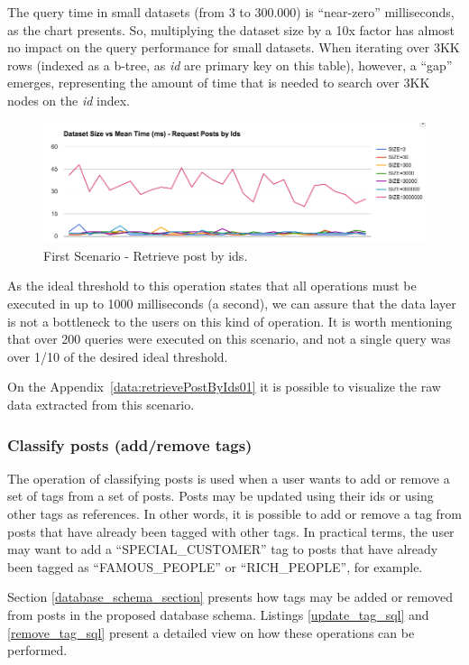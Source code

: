 The query time in small datasets (from 3 to 300.000) is ``near-zero'' milliseconds, as the chart presents. So, multiplying the dataset size by a 10x factor has almost no impact on the query performance for small datasets. When iterating over 3KK rows (indexed as a b-tree, as \textit{id} are primary key on this table), however, a ``gap'' emerges, representing the amount of time that is needed to search over 3KK nodes on the \textit{id} index. 

\begin{figure}
\centering
\includegraphics[width=150mm]{Imagens/execution-01.png}
\caption{First Scenario - Retrieve post by ids.\label{fig:first_scenario}}
\end{figure}

As the ideal threshold to this operation states that all operations must be executed in up to 1000 milliseconds (a second), we can assure that the data layer is not a bottleneck to the users on this kind of operation. It is worth mentioning that over 200 queries were executed on this scenario, and not a single query was over 1/10 of the desired ideal threshold. 



On the Appendix~\ref{data:retrievePostByIds01} it is possible to visualize the raw data extracted from this scenario. 

\clearpage
\subsubsection{Classify posts (add/remove tags)}

The operation of classifying posts is used when a user wants to add or remove a set of tags from a set of posts. Posts may be updated using their ids or using other tags as references. In other words, it is possible to add or remove a tag from posts that have already been tagged with other tags. In practical terms, the user may want to add a ``SPECIAL\_CUSTOMER'' tag to posts that have already been tagged as ``FAMOUS\_PEOPLE'' or ``RICH\_PEOPLE'', for example. 

Section \ref{database_schema_section} presents how tags may be added or removed from posts in the proposed database schema. Listings \ref{update_tag_sql} and \ref{remove_tag_sql} present a detailed view on how these operations can be performed. 

